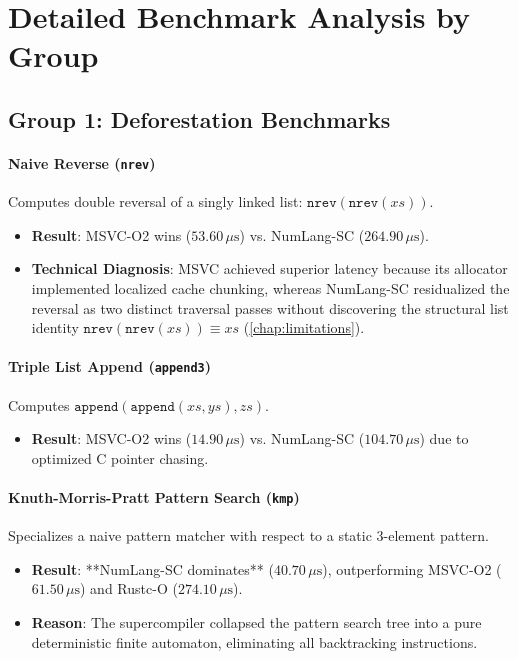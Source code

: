 \section{Detailed Benchmark Analysis by Group}
\label{sec:eval:groups}

\subsection{Group 1: Deforestation Benchmarks}

\paragraph{Naive Reverse (\texttt{nrev})}
Computes double reversal of a singly linked list: $\mathtt{nrev}(\mathtt{nrev}(xs))$.
\begin{itemize}
    \item \textbf{Result}: MSVC-O2 wins ($53.60\,\mu\text{s}$) vs. NumLang-SC ($264.90\,\mu\text{s}$).
    \item \textbf{Technical Diagnosis}: MSVC achieved superior latency because its allocator implemented localized cache chunking, whereas NumLang-SC residualized the reversal as two distinct traversal passes without discovering the structural list identity $\mathtt{nrev}(\mathtt{nrev}(xs)) \equiv xs$ (\cref{chap:limitations}).
\end{itemize}

\paragraph{Triple List Append (\texttt{append3})}
Computes $\mathtt{append}(\mathtt{append}(xs, ys), zs)$.
\begin{itemize}
    \item \textbf{Result}: MSVC-O2 wins ($14.90\,\mu\text{s}$) vs. NumLang-SC ($104.70\,\mu\text{s}$) due to optimized C pointer chasing.
\end{itemize}

\paragraph{Knuth-Morris-Pratt Pattern Search (\texttt{kmp})}
Specializes a naive pattern matcher with respect to a static 3-element pattern.
\begin{itemize}
    \item \textbf{Result}: **NumLang-SC dominates** ($40.70\,\mu\text{s}$), outperforming MSVC-O2 ($61.50\,\mu\text{s}$) and Rustc-O ($274.10\,\mu\text{s}$).
    \item \textbf{Reason}: The supercompiler collapsed the pattern search tree into a pure deterministic finite automaton, eliminating all backtracking instructions.
\end{itemize}

